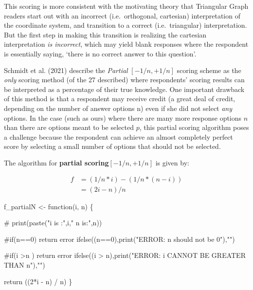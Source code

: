 \documentclass[
  letterpaper,
  DIV=11,
  numbers=noendperiod]{scrreprt}
\newenvironment{Shaded}{\begin{snugshade}}{\end{snugshade}}
\newcommand{\CommentTok}[1]{\textcolor[rgb]{0.37,0.37,0.37}{#1}}
\newcommand{\ControlFlowTok}[1]{\textcolor[rgb]{0.00,0.23,0.31}{#1}}
\newcommand{\DecValTok}[1]{\textcolor[rgb]{0.68,0.00,0.00}{#1}}
\newcommand{\FunctionTok}[1]{\textcolor[rgb]{0.28,0.35,0.67}{#1}}
\newcommand{\NormalTok}[1]{\textcolor[rgb]{0.00,0.23,0.31}{#1}}
\newcommand{\OtherTok}[1]{\textcolor[rgb]{0.00,0.23,0.31}{#1}}
\newcommand{\SpecialCharTok}[1]{\textcolor[rgb]{0.37,0.37,0.37}{#1}}
\newcommand{\StringTok}[1]{\textcolor[rgb]{0.13,0.47,0.30}{#1}}
\begin{document}
This scoring is more consistent with the motivating theory that
Triangular Graph readers start out with an incorrect (i.e.~orthogonal,
cartesian) interpretation of the coordinate system, and transition to a
correct (i.e.~triangular) interpretation. But the first step in making
this transition is realizing the cartesian interpretation \emph{is
incorrect}, which may yield blank responses where the respondent is
essentially saying, `there is no correct answer to this question'.

Schmidt et al. (2021) describe the \emph{Partial} \({[-1/n, +1/n]}\)
scoring scheme as the \emph{only} scoring method (of the 27 described)
where respondents' scoring results can be interpreted as a percentage of
their true knowledge. One important drawback of this method is that a
respondent may receive credit (a great deal of credit, depending on the
number of answer options n) even if she did not select \emph{any}
options. In the case (such as ours) where there are many more response
options \(n\) than there are options meant to be selected \(p\), this
partial scoring algorithm poses a challenge because the respondent can
achieve an almost completely perfect score by selecting a small number
of options that should not be selected.

The algorithm for \textbf{partial scoring}\([-1/n, +1/n]\) is given by:

\begin{align}
f &= (1/n * i) - (1/n * (n-i)) \\
&= (2i - n)/{n} 
\end{align}

\begin{Shaded}
\begin{Highlighting}[]
\NormalTok{f\_partialN }\OtherTok{\textless{}{-}} \ControlFlowTok{function}\NormalTok{(i, n) \{}

\CommentTok{\# print(paste("i is :",i," n is:",n))}

\CommentTok{\#if(n==0) return error}
\FunctionTok{ifelse}\NormalTok{((n}\SpecialCharTok{==}\DecValTok{0}\NormalTok{),}\FunctionTok{print}\NormalTok{(}\StringTok{"ERROR: n should not be 0"}\NormalTok{),}\StringTok{""}\NormalTok{)}

\CommentTok{\#if(i \textgreater{}n ) return error}
\FunctionTok{ifelse}\NormalTok{((i }\SpecialCharTok{\textgreater{}}\NormalTok{ n),}\FunctionTok{print}\NormalTok{(}\StringTok{"ERROR: i CANNOT BE GREATER THAN n"}\NormalTok{),}\StringTok{""}\NormalTok{)}

\FunctionTok{return}\NormalTok{ ((}\DecValTok{2}\SpecialCharTok{*}\NormalTok{i }\SpecialCharTok{{-}}\NormalTok{ n) }\SpecialCharTok{/}\NormalTok{ n) }
\NormalTok{\}}
\end{Highlighting}
\end{Shaded}
\end{document}
